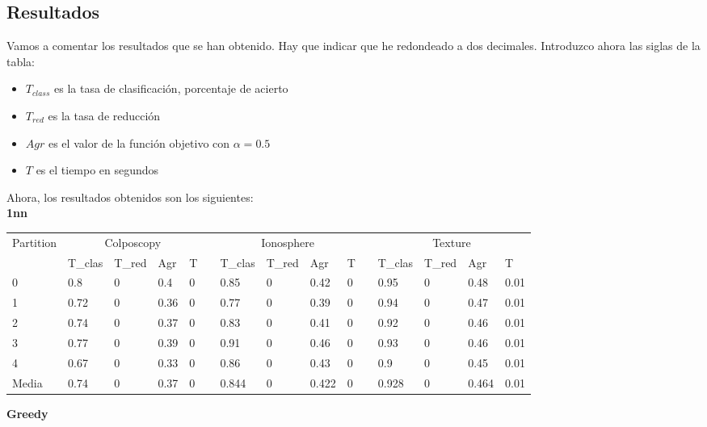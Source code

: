 \documentclass[11pt]{article}
\begin{document}
\subsection{Resultados}
Vamos a comentar los resultados que se han obtenido. Hay que indicar que he redondeado a dos decimales. 
Introduzco ahora las siglas de la tabla:
\begin{itemize}
	\item $T_{class}$ es la tasa de clasificación, porcentaje de acierto
	\item $T_{red}$ es la tasa de reducción
	\item $Agr$ es el valor de la función objetivo con $\alpha=0.5$
	\item $T$ es el tiempo en segundos
\end{itemize}

Ahora, los resultados obtenidos son los siguientes: \\

\textbf{1nn}\\

\begin{tabular}{lllllllllllllll}
Partition & \multicolumn{4}{c}{Colposcopy} &  & \multicolumn{4}{c}{Ionosphere} &  & \multicolumn{4}{c}{Texture}     \\
          & T\_clas  & T\_red  & Agr   & T &  & T\_clas  & T\_red  & Agr   & T &  & T\_clas & T\_red & Agr   & T    \\
0         & 0.8      & 0       & 0.4   & 0 &  & 0.85     & 0       & 0.42  & 0 &  & 0.95    & 0      & 0.48  & 0.01 \\
1         & 0.72     & 0       & 0.36  & 0 &  & 0.77     & 0       & 0.39  & 0 &  & 0.94    & 0      & 0.47  & 0.01 \\
2         & 0.74     & 0       & 0.37  & 0 &  & 0.83     & 0       & 0.41  & 0 &  & 0.92    & 0      & 0.46  & 0.01 \\
3         & 0.77     & 0       & 0.39  & 0 &  & 0.91     & 0       & 0.46  & 0 &  & 0.93    & 0      & 0.46  & 0.01 \\
4         & 0.67     & 0       & 0.33  & 0 &  & 0.86     & 0       & 0.43  & 0 &  & 0.9     & 0      & 0.45  & 0.01 \\
Media     & 0.74     & 0       & 0.37  & 0 &  & 0.844    & 0       & 0.422 & 0 &  & 0.928   & 0      & 0.464 & 0.01
\end{tabular}

\textbf{Greedy}\\
	
\end{document}
